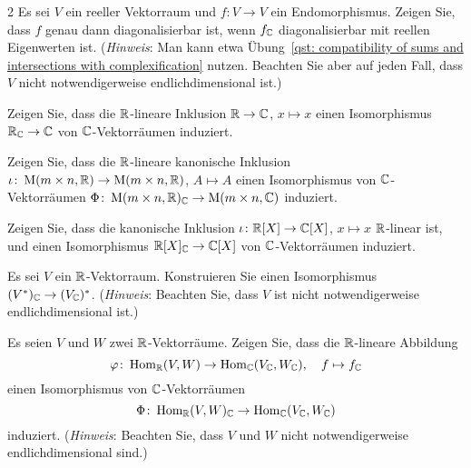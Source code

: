 \begin{question}[subtitle = Diagonalisierbarkeit der komplexifizierten Abbildung]{2}
  Es sei $V$ ein reeller Vektorraum und $f \colon V \to V$ ein Endomorphismus.
  Zeigen Sie, dass $f$ genau dann diagonalisierbar ist, wenn $f_{\mathbb{C}}$ diagonalisierbar mit reellen Eigenwerten ist.
  \newline
  (\emph{Hinweis}:
   Man kann etwa Übung~\ref{qst: compatibility of sums and intersections with complexification} nutzen.
   Beachten Sie aber auf jeden Fall, dass $V$ nicht notwendigerweise endlichdimensional ist.)
\end{question}






\begin{question}[subtitle = Komplexifizierung der reellen Zahlen]{3}
  Zeigen Sie, dass die $\mathbb{R}$-lineare Inklusion $\mathbb{R} \to \mathbb{C}$, $x \mapsto x$ einen Isomorphismus $\mathbb{R}_{\mathbb{C}} \to \mathbb{C}$ von $\mathbb{C}$-Vektorräumen induziert.
\end{question}


\begin{question}[subtitle = Komplexifizierung der Matrizen]{3}
  Zeigen Sie, dass die $\mathbb{R}$-lineare kanonische Inklusion $\iota \colon \operatorname{M}(m \times n, \mathbb{R}) \to \operatorname{M}(m \times n, \mathbb{R})$, $A \mapsto A$ einen Isomorphismus von $\mathbb{C}$-Vektorräumen $\Phi \colon \operatorname{M}(m \times n, \mathbb{R})_{\mathbb{C}} \to \operatorname{M}(m \times n, \mathbb{C})$ induziert.
\end{question}


\begin{question}[subtitle = Komplexifizierung des Polynomrings]{3}
  Zeigen Sie, dass die kanonische Inklusion $\iota \colon \mathbb{R}[X] \to \mathbb{C}[X]$, $x \mapsto x$ $\mathbb{R}$-linear ist, und einen Isomorphismus $\mathbb{R}[X]_{\mathbb{C}} \to \mathbb{C}[X]$ von $\mathbb{C}$-Vektorräumen induziert.
\end{question}


\begin{question}[subtitle = Komplexifizierung von Dualräumen]{3}
  Es sei $V$ ein $\mathbb{R}$-Vektorraum.
  Konstruieren Sie einen Isomorphismus $(V^*)_{\mathbb{C}} \to (V_{\mathbb{C}})^*$.
  \newline
  (\emph{Hinweis}:
   Beachten Sie, dass $V$ ist nicht notwendigerweise endlichdimensional ist.)
\end{question}


\begin{question}[subtitle = Komplexifizierung von $\Hom$-Räumen]{3}
  Es seien $V$ und $W$ zwei $\mathbb{R}$-Vektorräume.
  Zeigen Sie, dass die $\mathbb{R}$-lineare Abbildung
  \[
    \varphi \colon \operatorname{Hom}_{\mathbb{R}}(V, W) \to \operatorname{Hom}_{\mathbb{C}}(V_{\mathbb{C}}, W_{\mathbb{C}}),
    \quad
    f \mapsto f_{\mathbb{C}}
  \]
  einen Isomorphismus von $\mathbb{C}$-Vektorräumen
  \[
    \Phi \colon \operatorname{Hom}_{\mathbb{R}}(V, W)_{\mathbb{C}} \to \operatorname{Hom}_{\mathbb{C}}(V_{\mathbb{C}}, W_{\mathbb{C}})
  \]
  induziert.
  \newline
  (\emph{Hinweis}:
   Beachten Sie, dass $V$ und $W$ nicht notwendigerweise endlichdimensional sind.)
\end{question}





